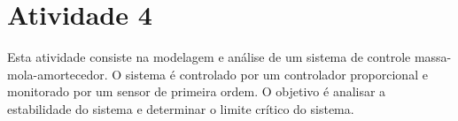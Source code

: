 
\section{Atividade 4}

Esta atividade consiste na modelagem e análise de um sistema de controle massa-mola-amortecedor. O sistema é controlado por um controlador proporcional e monitorado por um sensor de primeira ordem. O objetivo é analisar a estabilidade do sistema e determinar o limite crítico do sistema.








